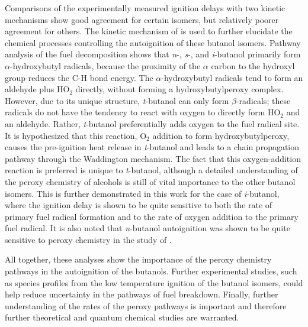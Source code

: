 \documentclass[12pt, letterpaper]{article}
\begin{document}
Comparisons of the experimentally measured ignition delays with two kinetic
mechanisms show good agreement for certain isomers, but relatively poorer
agreement for others. The kinetic mechanism of \textcite{Sarathy2012} is used
to further elucidate the chemical processes controlling the autoignition of
these butanol isomers. Pathway analysis of the fuel decomposition shows that
\textit{n}-, \textit{s}-, and \textit{i}-butanol primarily form
$\alpha$-hydroxybutyl radicals, because the proximity of the $\alpha$ carbon to
the hydroxyl group reduces the C-H bond energy. The $\alpha$-hydroxybutyl radicals
tend to form an aldehyde plus HO$_2$  directly, without forming a
hydroxybutylperoxy complex. However, due to its unique structure,
\textit{t}-butanol can only form $\beta$-radicals; these radicals do not have
the tendency to react with oxygen to directly form HO$_2$  and an aldehyde.
Rather, \textit{t}-butanol preferentially adds oxygen to the fuel radical site.
It is hypothesized that this reaction, O$_2$  addition to form
hydroxybutylperoxy, causes the pre-ignition heat release in \textit{t}-butanol
and leads to a chain propagation pathway through the Waddington mechanism. The
fact that this oxygen-addition reaction is preferred is unique to
\textit{t}-butanol, although a detailed understanding of the peroxy chemistry
of alcohols is still of vital importance to the other butanol isomers. This is
further demonstrated in this work for the case of \textit{i}-butanol, where the
ignition delay is shown to be quite sensitive to both the rate of primary fuel
radical formation and to the rate of oxygen addition to the primary fuel
radical. It is also noted that \textit{n}-butanol autoignition was shown to be
quite sensitive to peroxy chemistry in the study of \textcite{Vranckx2011}.

All together, these analyses show the importance of the peroxy chemistry
pathways in the autoignition of the butanols. Further experimental studies,
such as species profiles from the low temperature ignition of the butanol
isomers, could help reduce uncertainty in the pathways of fuel breakdown.
Finally, further understanding of the rates of the peroxy pathways is
important and therefore further theoretical and quantum chemical studies are
warranted.
\end{document}
